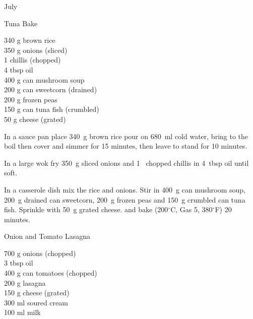 \begin{menu}{July}
    \begin{recipe}{2}{Tuna Bake}%
		\begin{ingredients}
		340 g brown rice  \\
	350 g onions (sliced) \\
	1  chillis (chopped) \\
	4 tbsp oil  \\
	400 g can mushroom soup  \\
	200 g can sweetcorn (drained) \\
	200 g frozen peas  \\
	150 g can tuna fish (crumbled) \\
	50 g cheese (grated) \\
	
		\end{ingredients}
	
	
    \begin{instructions}
    \item 
    In a
    sauce pan
    place
    340~g  brown rice
    pour on
    680~ml  cold water,
    bring to the boil then cover and simmer for 15 minutes,
    then leave to stand for 10 minutes.
  \item 
        In a large wok fry
        350~g sliced onions
        and
        1~ chopped chillis
        in
        4~tbsp  oil
        until soft.
      \item 
        In a casserole dish mix
        the rice and onions.
        Stir in
        400~g  can mushroom soup,
        200~g drained can sweetcorn,
        200~g  frozen peas
        and
        150~g crumbled can tuna fish.
        Sprinkle with
        50~g grated cheese.
        and
        bake (200$^{\circ}$C, Gas 5, 380$^{\circ}$F) 20 minutes.
      
    \end{instructions}
    \end{recipe}%
  
    \begin{recipe}{2}{Onion and Tomato Lasagna}%
		\begin{ingredients}
		700 g onions (chopped) \\
	3 tbsp oil  \\
	400 g can tomatoes (chopped) \\
	200 g lasagna  \\
	150 g cheese (grated) \\
	300 ml soured cream  \\
	100 ml milk  \\
	

\end{ingredients}
\end{recipe}
\end{menu}
